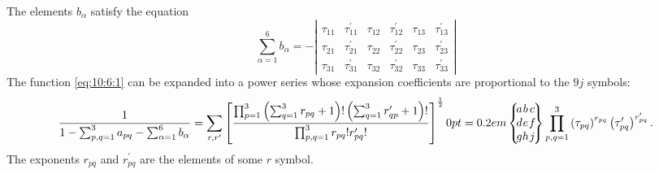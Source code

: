 The elements $b_{\alpha}$ satisfy the equation
\begin{equation}
\sum_{\alpha=1}^{6} b_{\alpha}=-\left|\begin{array}{llllll}
\tau_{11} & \tau_{11}^{\prime} & \tau_{12} & \tau_{12}^{\prime} & \tau_{13} & \tau_{13}^{\prime}  \label{eq:10:6:4}\\
\tau_{21} & \tau_{21}^{\prime} & \tau_{22} & \tau_{22}^{\prime} & \tau_{23} & \tau_{23}^{\prime} \\
\tau_{31} & \tau_{31}^{\prime} & \tau_{32} & \tau_{32}^{\prime} & \tau_{33} & \tau_{33}^{\prime}
\end{array}\right|
\end{equation}
The function \eqref{eq:10:6:1} can be expanded into a power series whose expansion coefficients are proportional to the $9 j$ symbols:
\begin{equation}
\frac{1}{1-\sum_{p, q=1}^{3} a_{p q}-\sum_{\alpha=1}^{6} b_{\alpha}}=\sum_{r, r^{\prime}}\left[\frac{\prod_{p=1}^{3}\left(\sum_{q=1}^{3} r_{p q}+1\right)!\left(\sum_{q=1}^{3} r_{q p}^{\prime}+1\right)!}{\prod_{p, q=1}^{3} r_{p q}!r_{p q}^{\prime}!}\right]^{\frac{1}{2}}\ninej{a}{b}{c}{d}{e}{f}{g}{h}{j} \label{eq:10:6:5}\prod_{p, q=1}^{3}\left(\tau_{p q}\right)^{r_{p q}}\left(\tau_{p q}^{\prime}\right)^{r_{p q}^{\prime}} .
\end{equation}
The exponents $r_{p q}$ and $r_{p q}^{\prime}$ are the elements of some $r$ symbol.

